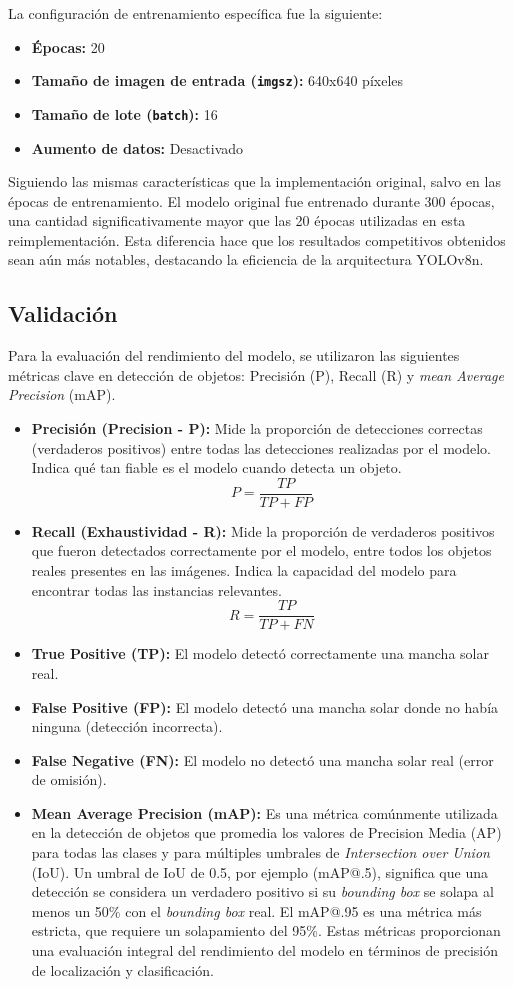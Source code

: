\documentclass[journal]{IEEEtran}
\begin{document}
La configuración de entrenamiento específica fue la siguiente:
\begin{itemize}
    \item \textbf{Épocas:} 20
    \item \textbf{Tamaño de imagen de entrada (\texttt{imgsz}):} 640x640 píxeles
    \item \textbf{Tamaño de lote (\texttt{batch}):} 16
    \item \textbf{Aumento de datos:} Desactivado
\end{itemize}

Siguiendo las mismas características que la implementación original, salvo en las épocas de entrenamiento. El modelo original fue entrenado durante 300 épocas, una cantidad significativamente mayor que las 20 épocas utilizadas en esta reimplementación. Esta diferencia hace que los resultados competitivos obtenidos sean aún más notables, destacando la eficiencia de la arquitectura YOLOv8n.


\subsection{Validación}
Para la evaluación del rendimiento del modelo, se utilizaron las siguientes métricas clave en detección de objetos: Precisión (P), Recall (R) y \textit{mean Average Precision} (mAP).

\begin{itemize}
    \item \textbf{Precisión (Precision - P):} Mide la proporción de detecciones correctas (verdaderos positivos) entre todas las detecciones realizadas por el modelo. Indica qué tan fiable es el modelo cuando detecta un objeto.
    \[ P = \frac{TP}{TP+FP} \]
    \item \textbf{Recall (Exhaustividad - R):} Mide la proporción de verdaderos positivos que fueron detectados correctamente por el modelo, entre todos los objetos reales presentes en las imágenes. Indica la capacidad del modelo para encontrar todas las instancias relevantes.
    \[ R = \frac{TP}{TP+FN} \]
    \item \textbf{True Positive (TP):} El modelo detectó correctamente una mancha solar real.
    \item \textbf{False Positive (FP):} El modelo detectó una mancha solar donde no había ninguna (detección incorrecta).
    \item \textbf{False Negative (FN):} El modelo no detectó una mancha solar real (error de omisión).
    \item \textbf{Mean Average Precision (mAP):} Es una métrica comúnmente utilizada en la detección de objetos que promedia los valores de Precision Media (AP) para todas las clases y para múltiples umbrales de \textit{Intersection over Union} (IoU). Un umbral de IoU de 0.5, por ejemplo (mAP@.5), significa que una detección se considera un verdadero positivo si su \textit{bounding box} se solapa al menos un 50\% con el \textit{bounding box} real. El mAP@.95 es una métrica más estricta, que requiere un solapamiento del 95\%. Estas métricas proporcionan una evaluación integral del rendimiento del modelo en términos de precisión de localización y clasificación.
\end{itemize}
\end{document}
